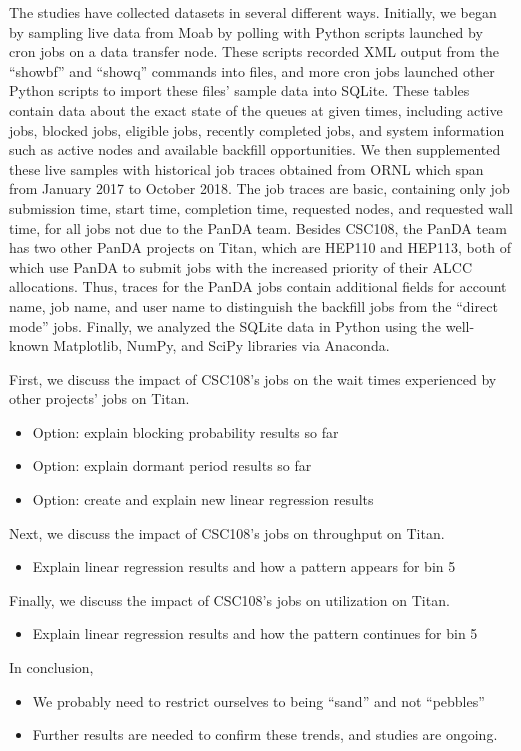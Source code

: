 The studies have collected datasets in several different ways. Initially, we
began by sampling live data from Moab by polling with Python scripts launched
by cron jobs on a data transfer node. These scripts recorded XML output from
the ``showbf'' and ``showq'' commands into files, and more cron jobs launched
other Python scripts to import these files' sample data into SQLite. These
tables contain data about the exact state of the queues at given times,
including active jobs, blocked jobs, eligible jobs, recently completed jobs,
and system information such as active nodes and available backfill
opportunities. We then supplemented these live samples with historical job
traces obtained from ORNL which span from January 2017 to October 2018. The job
traces are basic, containing only job submission time, start time, completion
time, requested nodes, and requested wall time, for all jobs not due to the
PanDA team. Besides CSC108, the PanDA team has two other PanDA projects on
Titan, which are HEP110 and HEP113, both of which use PanDA to submit jobs with
the increased priority of their ALCC allocations. Thus, traces for the PanDA
jobs contain additional fields for account name, job name, and user name to
distinguish the backfill jobs from the ``direct mode'' jobs. Finally, we
analyzed the SQLite data in Python using the well-known Matplotlib, NumPy, and
SciPy libraries via Anaconda.

First, we discuss the impact of CSC108's jobs on the wait times experienced by
other projects' jobs on Titan.
\begin{itemize}
    \item Option: explain blocking probability results so far
    \item Option: explain dormant period results so far
    \item Option: create and explain new linear regression results
\end{itemize}

Next, we discuss the impact of CSC108's jobs on throughput on Titan.
\begin{itemize}
    \item Explain linear regression results and how a pattern appears for bin 5
\end{itemize}

Finally, we discuss the impact of CSC108's jobs on utilization on Titan.
\begin{itemize}
    \item Explain linear regression results and how the pattern continues for
        bin 5
\end{itemize}

In conclusion,
\begin{itemize}
    \item We probably need to restrict ourselves to being ``sand'' and not
        ``pebbles''
    \item Further results are needed to confirm these trends, and studies are
        ongoing.
\end{itemize}



